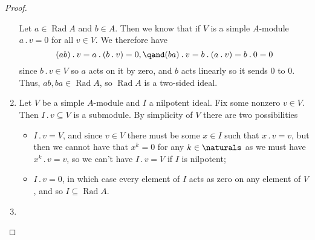 \documentclass[fleqn]{NotesClass}
\newcommand{\action}{\mathbin{.}}
\DeclareMathOperator{\Rad}{Rad}
\begin{document}
\begin{prp}{}{}
\begin{proof}
\begin{enumerate}
                Let \(a \in \Rad A\) and \(b \in A\).
                Then we know that if \(V\) is a simple \(A\)-module \(a \action v = 0\) for all \(v \in V\).
                We therefore have
                \begin{equation}
                    (ab) \action v = a \action (b \action v) = 0, \qand (ba) \action v = b \action (a \action v) = b \action 0 = 0
                \end{equation}
                since \(b \action v \in V\) so \(a\) acts on it by zero, and \(b\) acts linearly so it sends \(0\) to \(0\).
                Thus, \(ab, ba \in \Rad A\), so \(\Rad A\) is a two-sided ideal.
                \item Let \(V\) be a simple \(A\)-module and \(I\) a nilpotent ideal.
                Fix some nonzero \(v \in V\).
                Then \(I \action v \subseteq V\) is a submodule.
                By simplicity of \(V\) there are two possibilities
                \begin{itemize}
                    \item \(I \action v = V\), and since \(v \in V\) there must be some \(x \in I\) such that \(x \action v = v\), but then we cannot have that \(x^k = 0\) for any \(k \in \naturals\) as we must have \(x^k \action v = v\), so we can't have \(I \action v = V\) if \(I\) is nilpotent;
                    \item \(I \action v = 0\), in which case every element of \(I\) acts as zero on any element of \(V\), and so \(I \subseteq \Rad A\).
                \end{itemize}
                \item %
            \end{enumerate}
        \end{proof}
    \end{prp}
    
%	

    \backmatter
    \renewcommand{\glossaryname}{Acronyms}
    \printglossary[acronym]
    \printindex
\end{document}
